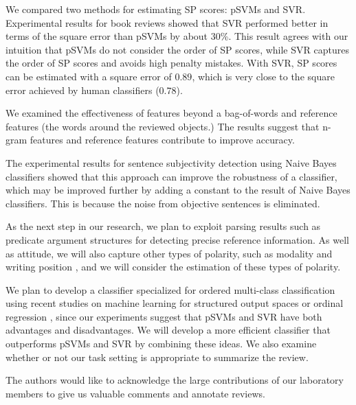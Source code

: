 \documentclass[japanese]{jnlp_1.3d}
\begin{document}
We compared two methods for estimating SP scores: pSVMs and SVR. Experimental results for book reviews showed that SVR performed better in terms of the square error than pSVMs by about $30$\%. This result agrees with our intuition that pSVMs do not consider the order of SP scores, while SVR captures the order of SP scores and avoids high penalty mistakes. With SVR, SP scores can be estimated with a square error of $0.89$, which is very close to the square error achieved by human classifiers ($0.78$).

We examined the effectiveness of features beyond a bag-of-words and reference features (the words around the reviewed objects.) The results suggest that n-gram features and reference features contribute to improve accuracy.

The experimental results for sentence subjectivity detection using Naive Bayes classifiers showed that this approach can improve the robustness of a classifier, which may be improved further by adding a constant to the result of Naive Bayes classifiers. This is because the noise from objective sentences is eliminated.

As the next step in our research, we plan to exploit parsing results such as predicate argument structures for detecting precise reference information. As well as attitude, we will also capture other types of polarity, such as modality and writing position \cite{Kudo2004}, and we will consider the estimation of these types of polarity.

We plan to develop a classifier specialized for ordered multi-class classification using recent studies on machine learning for structured output spaces \cite{Tsochantaridis2004,Taskar2004} or ordinal regression \cite{LargeM2000,Wei2005}, since our experiments suggest that pSVMs and SVR have both advantages and disadvantages. We will develop a more efficient classifier that outperforms pSVMs and SVR by combining these ideas. We also examine whether or not our task setting is appropriate to summarize the review. 




\acknowledgment

The authors would like to acknowledge the large contributions of our laboratory members to give us valuable comments
and annotate reviews.
\end{document}
